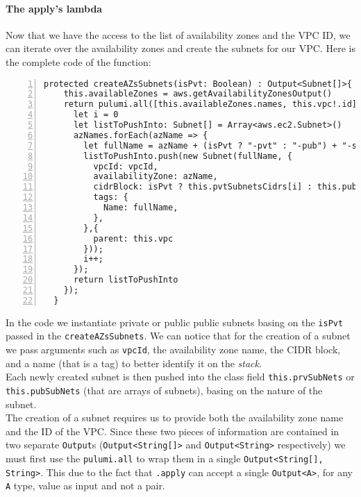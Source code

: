 \paragraph{The apply's lambda}
\label{par:ts-lambda}
Now that we have the access to the list of availability zones and the VPC ID, we can iterate over the availability zones and create the subnets for our VPC.
Here is the complete code of the function:\\
\begin{minipage}{\linewidth}
\begin{lstlisting}[numbers=left, numberstyle=\tiny, numbersep=-5pt, stepnumber=1]
  protected createAZsSubnets(isPvt: Boolean) : Output<Subnet[]>{
    this.availableZones = aws.getAvailabilityZonesOutput()
    return pulumi.all([this.availableZones.names, this.vpc!.id]).apply(([azNames, vpcId]) => {
      let i = 0
      let listToPushInto: Subnet[] = Array<aws.ec2.Subnet>()
      azNames.forEach(azName => {
        let fullName = azName + (isPvt ? "-pvt" : "-pub") + "-subnet-typescript"
        listToPushInto.push(new Subnet(fullName, {
          vpcId: vpcId,
          availabilityZone: azName,
          cidrBlock: isPvt ? this.pvtSubnetsCidrs[i] : this.pubSubnetsCidrs[i],
          tags: {
            Name: fullName,
          },
        },{
          parent: this.vpc
        }));
        i++;
      });
      return listToPushInto
    });
  }
\end{lstlisting}
\end{minipage}
In the code we instantiate private or public public subnets basing on the \texttt{isPvt} passed in the \texttt{createAZsSubnets}.
We can notice that for the creation of a subnet we pass arguments such as \texttt{vpcId}, the availability zone name, the CIDR block, and a name (that is a tag) to better identify it on the \textit{stack}.\\
Each newly created subnet is then pushed into the class field \texttt{this.prvSubNets} or \texttt{this.pubSubNets} (that are arrays of subnets), basing on the nature of the subnet.\\
The creation of a subnet requires us to provide both the availability zone name and the ID of the VPC.
Since these two pieces of information are contained in two separate \texttt{Output}s (\texttt{Output<String[]>} and \texttt{Output<String>} respectively) we must first use the \texttt{pulumi.all} to wrap them in a single \texttt{Output<String[], String>}.
This due to the fact that \texttt{.apply} can accept a single \texttt{Output<A>}, for any \texttt{A} type, value as input and not a pair.
